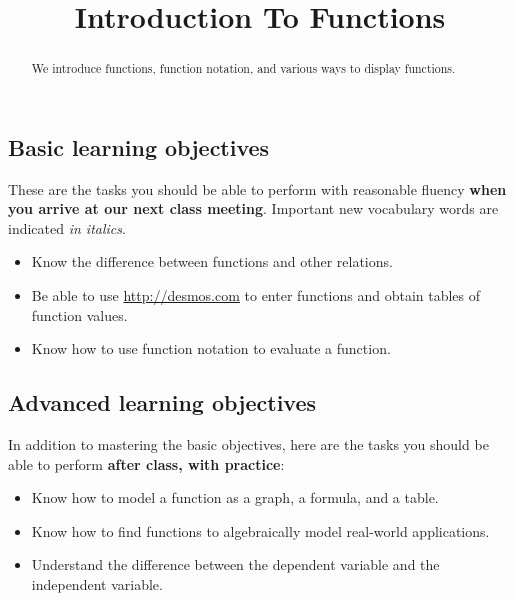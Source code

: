 \documentclass{ximera}
\title{Introduction To Functions}
\begin{document}
\begin{abstract}
We introduce functions, function notation, and various ways to display functions.
\end{abstract}
\maketitle

\subsection*{Basic learning objectives}

These are the tasks you should be able to perform with reasonable fluency \textbf{when you arrive at our next class meeting}. Important new vocabulary words are indicated \emph{in italics}. 

\begin{itemize}
	\item Know the difference between functions and other relations.
	\item Be able to use \url{http://desmos.com} to enter functions and obtain tables of function values.
	\item Know how to use function notation to evaluate a function.
\end{itemize}

\subsection*{Advanced learning objectives}

In addition to mastering the basic objectives, here are the tasks you should be able to perform \textbf{after class, with practice}: 

\begin{itemize}
	\item Know how to model a function as a graph, a formula, and a table.
	\item Know how to find functions to algebraically model real-world applications.
    \item Understand the difference between the dependent variable and the independent variable.
\end{itemize}
\end{document}
